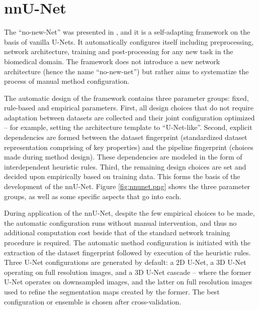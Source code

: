 \section{nnU-Net}
The ``no-new-Net'' was presented in \citeyear{nnUnet}, and it is a self-adapting framework on the basis of vanilla U-Nets. It automatically configures itself including preprocessing, network architecture, training and post-processing for any new task in the biomedical domain. The framework does not introduce a new network architecture (hence the name ``no-new-net'') but rather aims to systematize the process of manual method configuration.

The automatic design of the framework contains three parameter groups: fixed, rule-based and empirical parameters. First, all design choices that do not require adaptation between datasets are collected and their joint configuration optimized -- for example, setting the architecture template to ``U-Net-like''. Second, explicit dependencies are formed between the dataset fingerprint (standardized dataset representation comprising of key properties) and the pipeline fingerprint (choices made during method design). These dependencies are modeled in the form of interdependent heuristic rules. Third, the remaining design choices are set and decided upon empirically based on training data. This forms the basis of the development of the nnU-Net. Figure \ref{fig:nnunet.png} shows the three parameter groups, as well as some specific aspects that go into each.


During application of the nnU-Net, despite the few empirical choices to be made, the automatic configuration runs without manual intervention, and thus no additional computation cost beside that of the standard network training procedure is required. The automatic method configuration is initiated with the extraction of the dataset fingerprint followed by execution of the heuristic rules. Three U-Net configurations are generated by default: a 2D U-Net, a 3D U-Net operating on full resolution images, and a 3D U-Net cascade -- where the former U-Net operates on downsampled images, and the latter on full resolution images used to refine the segmentation maps created by the former. The best configuration or ensemble is chosen after cross-validation. 



